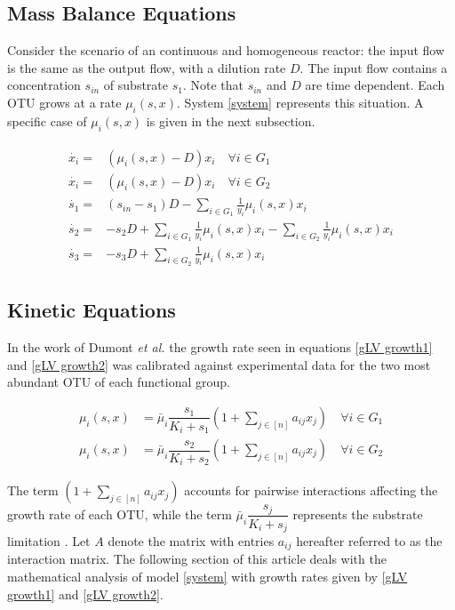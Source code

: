\documentclass[3p,times]{article}
\begin{document}
\subsection{Mass Balance Equations}

Consider the scenario of an continuous and homogeneous reactor: the input flow is the same as the output flow, with a dilution rate $D$. The input flow contains a concentration $s_{in}$ of substrate $s_1$. Note that $s_{in}$ and $D$ are time dependent. Each OTU grows at a rate $\mu_i(s,x)$. System \eqref{system} represents this situation. A specific case of $\mu_i(s,x)$ is given in the next subsection. 

\begin{align} 
\label{system}
\begin{array}{cl}
\dot{x_i} =& \left(\mu_i(s,x) -D \right)x_i \quad \forall i \in G_1\\
\dot{x_i} =& \left(\mu_i(s,x) -D \right)x_i \quad \forall i \in G_2 \\
\dot{s_1} =& \displaystyle (s_{in}-s_1)D-\sum\limits_{i\in G_1} \frac{1}{y_i}\mu_i(s,x) x_i  \\
\dot{s_2} = & \displaystyle -s_2D+\sum\limits_{i\in G_1}\frac{1}{y_i}\mu_i(s,x)x_i 		-\sum\limits_{i\in G_2}\frac{1}{y_i}\mu_i(s,x) x_i  \\
\dot{s_3} =&  \displaystyle -s_3D+\sum\limits_{i\in G_2}\frac{1}{y_i}\mu_i(s,x) x_i 
\end{array}
\end{align}	

\subsection{Kinetic Equations}
In the work of Dumont \textit{et al.} \cite{Dumont2016} the growth rate seen in equations \eqref{gLV growth1} and \eqref{gLV growth2} was calibrated against experimental data for the two most abundant OTU of each functional group.

\begin{align}
\label{gLV growth1}\mu_i(s,x) &= \bar{\mu}_i \dfrac{s_1}{K_i + s_1}\left(1+\sum \limits_{j\in [n]} a_{ij} x_{j} \right) \quad \forall i \in G_1 \\
\label{gLV growth2}\mu_i(s,x) &= \bar{\mu}_i \dfrac{s_2}{K_i + s_2}\left(1+\sum \limits_{j\in [n]} a_{ij} x_{j} \right) \quad \forall i \in G_2 
\end{align}

The term $\left(1+\sum \limits_{j\in [n]} a_{ij} x_{j} \right)$ accounts for pairwise interactions affecting the growth rate of each OTU, while the term $\bar{\mu}_i\dfrac{s_j}{K_i + s_j}$ represents the substrate limitation \cite{monod1942recherches}. Let $A$ denote the matrix
with entries $a_{ij}$ hereafter referred to as the interaction matrix. The following section of this article deals with the mathematical analysis of model \eqref{system} with growth rates given by \eqref{gLV growth1} and \eqref{gLV growth2}.
\end{document}
